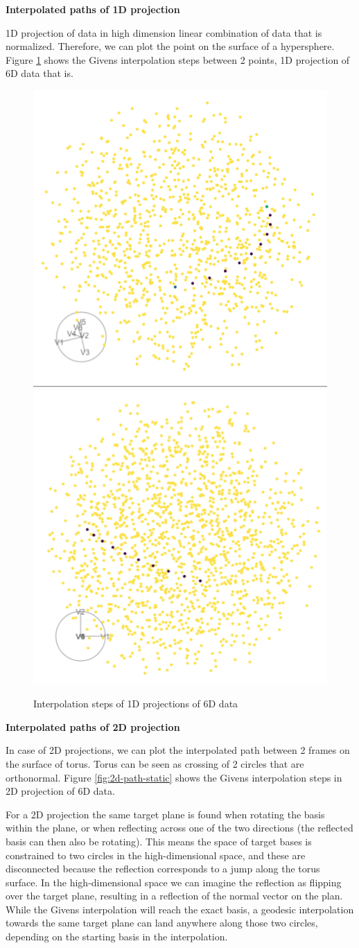 \textbf{Interpolated paths of 1D projection}

1D projection of data in high dimension linear combination of data that is normalized. Therefore, we can plot the point on the surface of a hypersphere. Figure \ref{fig:1d-path-static} shows the Givens interpolation steps between 2 points, 1D projection of 6D data that is.

\begin{figure}

{\centering \includegraphics[width=0.5\linewidth]{sphere_static} \includegraphics[width=0.5\linewidth]{torus_static} 

}

\caption{Interpolation steps of 1D projections of 6D data}\label{fig:1d-path-static}
\end{figure}

\textbf{Interpolated paths of 2D projection}

In case of 2D projections, we can plot the interpolated path between 2 frames on the surface of torus. Torus can be seen as crossing of 2 circles that are orthonormal. Figure \ref{fig:2d-path-static} shows the Givens interpolation steps in 2D projection of 6D data.

For a 2D projection the same target plane is found when rotating the basis within the plane, or when reflecting across one of the two directions (the reflected basis can then also be rotating). This means the space of target bases is constrained to two circles in the high-dimensional space, and these are disconnected because the reflection corresponds to a jump along the torus surface. In the high-dimensional space we can imagine the reflection as flipping over the target plane, resulting in a reflection of the normal vector on the plan.
While the Givens interpolation will reach the exact basis, a geodesic interpolation towards the same target plane can land anywhere along those two circles, depending on the starting basis in the interpolation.

